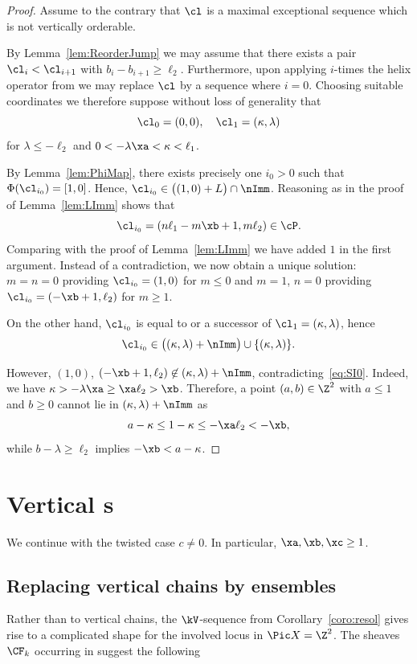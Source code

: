 \begin{proof}
Assume to the contrary that $\cl$ is a maximal 
exceptional sequence which is not vertically 
orderable. 

By Lemma~\ref{lem:ReorderJump} we may assume 
that there exists a pair $\cl_i<\cl_{i+1}$
with $b_i-b_{i+1}\geq\ell_2$. Furthermore, upon
applying $i$-times the helix operator from 
 we may replace $\cl$
by a sequence where $i=0$. Choosing suitable
coordinates we therefore suppose
without loss of generality that
$$
\cl_0=(0,0),\quad\cl_1=(\kappa,\lambda)
$$
for $\lambda\leq-\ell_2$ and 
$0<-\lambda\xa<\kappa<\ell_1$. 

By Lemma~\ref{lem:PhiMap}, there exists precisely 
one $i_0>0$ such that $\Phi(\cl_{i_0})=[1,0]$. 
Hence, $\cl_{i_0}\in\big((1,0)+L\big)\cap\nImm$. 
Reasoning as in the proof of Lemma~\ref{lem:LImm} 
{shows that} 
$$
\cl_{i_0}=(n\ell_1-m\xb+1,m\ell_2)\in\cP. 
$$
{Comparing with the proof of
Lemma~\ref{lem:LImm} we have added $1$ in the first argument. 
Instead of a contradiction, we now obtain a unique solution:
$m=n=0$ providing $\cl_{i_0}=(1,0)$ for $m\leq0$ and 
$m=1$, $n=0$ providing $\cl_{i_0}=(-\xb+1,\ell_2)$ for $m\geq1$.}

On the other hand, $\cl_{i_0}$ is equal to or 
a successor of $\cl_1=(\kappa,\lambda)$, hence
\begin{equation}\label{eq:SI0}
\cl_{i_0}\in\big((\kappa,\lambda)+\nImm\big)
\cup\{(\kappa,\lambda)\}.
\end{equation}

However, $(1,0)$, 
$(-\xb+1,\ell_2)\not\in(\kappa,\lambda)+\nImm$, 
contradicting~\eqref{eq:SI0}. Indeed, we have 
$\kappa>-\lambda\xa\geq\xa\ell_2>\xb$.
Therefore, a point 
$(a,b)\in\Z^2$ with $a\leq1$ and $b\geq0$ cannot 
lie in $(\kappa,\lambda)+\nImm$ as
$$
a-\kappa\leq1-\kappa\leq-\xa\ell_2<-\xb,
$$
while $b-\lambda\geq\ell_2$ implies 
$-\xb<a-\kappa$. 
\end{proof}

\section{Vertical {\wbox}s}
\label{sec:HCVB}
{We continue with the twisted case $c\neq 0$.
In particular, $\xa,\xb,\xc\geq 1$.}
\subsection{Replacing vertical chains by 
ensembles}
\label{subsec:vertBoxes}
Rather than to vertical chains, the $\kV$-sequence 
from Corollary~\ref{coro:resol} gives rise to 
a complicated shape for the involved locus 
in $\Pic X=\Z^2$. The sheaves
$\CF_k$ occurring in 
suggest the following  

